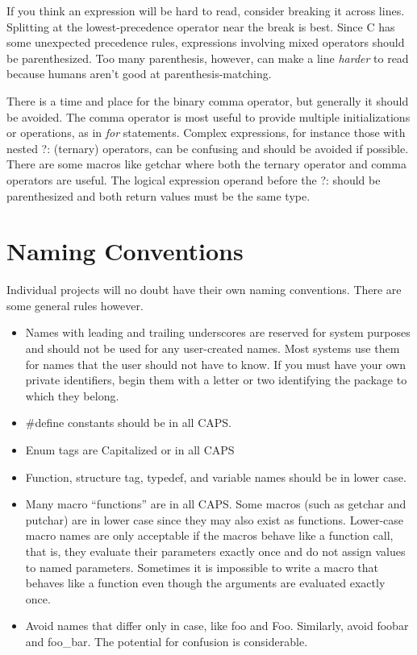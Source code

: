 If you think an expression will be hard to read, consider breaking
it across lines. Splitting at the lowest-precedence operator near the
break is best. Since C has some unexpected precedence rules,
expressions involving mixed operators should be parenthesized. Too many
parenthesis, however, can make a line {\em harder} to read because
humans aren't good at parenthesis-matching. 

 There is a time and place for the binary comma operator, but generally it
should be avoided. The comma operator is most useful to provide multiple
initializations or operations, as in {\em for} statements. Complex
expressions, for instance those with nested ?: (ternary) operators,
can be confusing and should be avoided if possible. There are some
macros like getchar where both the ternary operator and comma operators
are useful. The logical expression operand before the ?: should be
parenthesized and both return values must be the same type. 

\section{Naming Conventions}

 Individual projects will no doubt have their own naming conventions. There are
some general rules however.
\begin{itemize}
\item Names with leading and trailing underscores are reserved for system
purposes and should not be used for any user-created names. Most systems use
them for names that the user should not have to know. If you must have your
own private identifiers, begin them with a letter or two identifying the
package to which they belong.

\item \#define constants should be in all CAPS. 

\item Enum tags are Capitalized or in all CAPS 

\item Function, structure tag, typedef, and variable names should be in lower
case. 

\item Many macro ``functions'' are in all CAPS. Some macros (such as getchar and
putchar)  are in lower case since they may also exist as functions. Lower-case
macro names are
only acceptable if the macros behave like a function call, that is, they
evaluate their parameters exactly once and do not assign values to named
parameters. Sometimes it is impossible to write a macro that behaves like a
function even though the arguments are evaluated exactly once.

\item Avoid names that differ only in case, like foo and Foo. Similarly, avoid
foobar and foo\_bar. The potential for confusion is considerable. 
\end{itemize}

